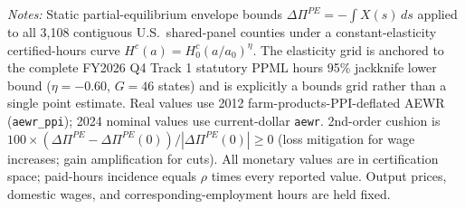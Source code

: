 \begin{table}[!htbp]
\begin{tabular}{lrrrrr}
\bottomrule
\end{tabular}
\begin{minipage}{0.96\linewidth}
\vspace{0.4em}\footnotesize
\textit{Notes:} Static partial-equilibrium envelope bounds $\Delta\Pi^{PE}=-\int X(s)\,ds$ applied to all 3,108 contiguous U.S.\ shared-panel counties under a constant-elasticity certified-hours curve $H^c(a)=H^c_0(a/a_0)^\eta$. The elasticity grid is anchored to the complete FY2026 Q4 Track 1 statutory PPML hours 95\% jackknife lower bound ($\eta = -0.60$, $G=46$ states) and is explicitly a bounds grid rather than a single point estimate. Real values use 2012 farm-products-PPI-deflated AEWR (\texttt{aewr\_ppi}); 2024 nominal values use current-dollar \texttt{aewr}. 2nd-order cushion is $100\times(\Delta\Pi^{PE}-\Delta\Pi^{PE}(0))/|\Delta\Pi^{PE}(0)| \ge 0$ (loss mitigation for wage increases; gain amplification for cuts). All monetary values are in certification space; paid-hours incidence equals $\rho$ times every reported value. Output prices, domestic wages, and corresponding-employment hours are held fixed.
\end{minipage}
\end{table}

